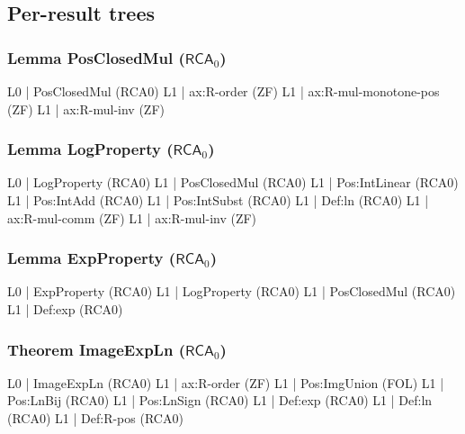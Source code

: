 \documentclass[11pt,reqno]{amsart}
\theoremstyle{redplain}
\begin{document}
\medskip

\subsection{Per-result trees}

\subsubsection*{Lemma \textsf{PosClosedMul} ($\mathsf{RCA}_0$)}

\begin{verbatimbox}
	L0 | PosClosedMul                     (RCA0)
	L1 |   ax:R-order                     (ZF)
	L1 |   ax:R-mul-monotone-pos          (ZF)
	L1 |   ax:R-mul-inv                   (ZF)
\end{verbatimbox}

\subsubsection*{Lemma \textsf{LogProperty} ($\mathsf{RCA}_0$)}

\begin{verbatimbox}
	L0 | LogProperty                      (RCA0)
	L1 |   PosClosedMul                   (RCA0)
	L1 |   Pos:IntLinear                  (RCA0)
	L1 |   Pos:IntAdd                     (RCA0)
	L1 |   Pos:IntSubst                   (RCA0)
	L1 |   Def:ln                         (RCA0)
	L1 |   ax:R-mul-comm                  (ZF)
	L1 |   ax:R-mul-inv                   (ZF)
\end{verbatimbox}

\subsubsection*{Lemma \textsf{ExpProperty} ($\mathsf{RCA}_0$)}

\begin{verbatimbox}
	L0 | ExpProperty                      (RCA0)
	L1 |   LogProperty                    (RCA0)
	L1 |   PosClosedMul                   (RCA0)
	L1 |   Def:exp                        (RCA0)
\end{verbatimbox}

\subsubsection*{Theorem \textsf{ImageExpLn} ($\mathsf{RCA}_0$)}

\begin{verbatimbox}
	L0 | ImageExpLn                       (RCA0)
	L1 |   ax:R-order                     (ZF)
	L1 |   Pos:ImgUnion                   (FOL)
	L1 |   Pos:LnBij                      (RCA0)
	L1 |   Pos:LnSign                     (RCA0)
	L1 |   Def:exp                        (RCA0)
	L1 |   Def:ln                         (RCA0)
	L1 |   Def:R-pos                      (RCA0)
\end{verbatimbox}
\end{document}
